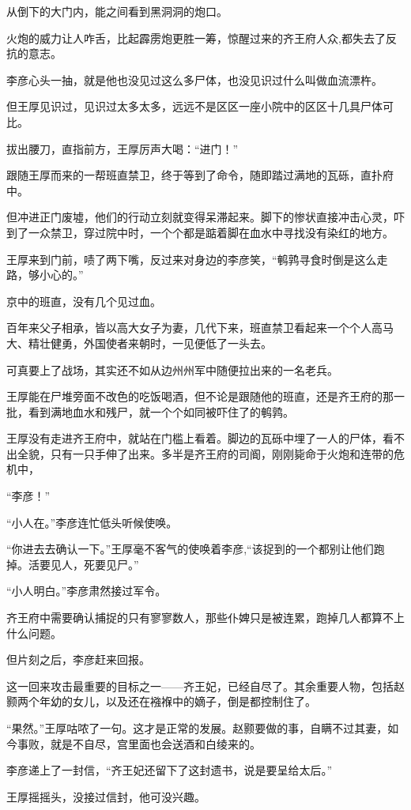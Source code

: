 从倒下的大门内，能之间看到黑洞洞的炮口。

火炮的威力让人咋舌，比起霹雳炮更胜一筹，惊醒过来的齐王府人众,都失去了反抗的意志。

李彦心头一抽，就是他也没见过这么多尸体，也没见识过什么叫做血流漂杵。

但王厚见识过，见识过太多太多，远远不是区区一座小院中的区区十几具尸体可比。

拔出腰刀，直指前方，王厚厉声大喝：“进门！”

跟随王厚而来的一帮班直禁卫，终于等到了命令，随即踏过满地的瓦砾，直扑府中。

但冲进正门废墟，他们的行动立刻就变得呆滞起来。脚下的惨状直接冲击心灵，吓到了一众禁卫，穿过院中时，一个个都是踮着脚在血水中寻找没有染红的地方。

王厚来到门前，啧了两下嘴，反过来对身边的李彦笑，“鹌鹑寻食时倒是这么走路，够小心的。”

京中的班直，没有几个见过血。

百年来父子相承，皆以高大女子为妻，几代下来，班直禁卫看起来一个个人高马大、精壮健勇，外国使者来朝时，一见便低了一头去。

可真要上了战场，其实还不如从边州州军中随便拉出来的一名老兵。

王厚能在尸堆旁面不改色的吃饭喝酒，但不论是跟随他的班直，还是齐王府的那一批，看到满地血水和残尸，就一个个如同被吓住了的鹌鹑。

王厚没有走进齐王府中，就站在门槛上看着。脚边的瓦砾中埋了一人的尸体，看不出全貌，只有一只手伸了出来。多半是齐王府的司阍，刚刚毙命于火炮和连带的危机中，

“李彦！”

“小人在。”李彦连忙低头听候使唤。

“你进去去确认一下。”王厚毫不客气的使唤着李彦,“该捉到的一个都别让他们跑掉。活要见人，死要见尸。”

“小人明白。”李彦肃然接过军令。

齐王府中需要确认捕捉的只有寥寥数人，那些仆婢只是被连累，跑掉几人都算不上什么问题。

但片刻之后，李彦赶来回报。

这一回来攻击最重要的目标之一——齐王妃，已经自尽了。其余重要人物，包括赵颢两个年幼的女儿，以及还在襁褓中的嫡子，倒是都控制住了。

“果然。”王厚咕哝了一句。这才是正常的发展。赵颢要做的事，自瞒不过其妻，如今事败，就是不自尽，宫里面也会送酒和白绫来的。

李彦递上了一封信，“齐王妃还留下了这封遗书，说是要呈给太后。”

王厚摇摇头，没接过信封，他可没兴趣。

